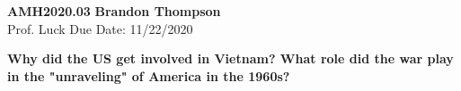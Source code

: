 \noindent
\textbf{AMH2020.03} \hfill \textbf{Brandon Thompson} \\
\normalsize Prof. Luck \hfill Due Date: 11/22/2020 \\

\begin{center}
\textbf{Why did the US get involved in Vietnam? What role did the war play in the "unraveling" of America in the 1960s? }
\end{center}